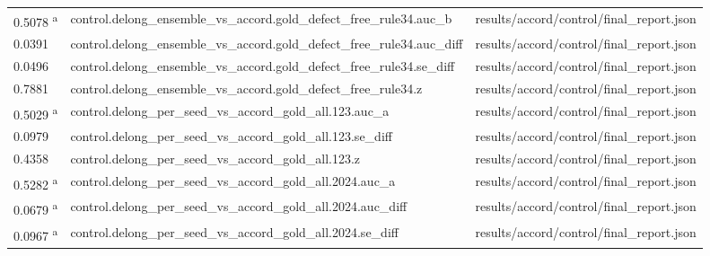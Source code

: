 \begin{longtable}{@{}p{0.7in}p{1.9in}p{2.6in}@{}}
0.5078 \textsuperscript{a} & control.\allowbreak{}delong\_ensemble\_vs\_accord.\allowbreak{}gold\_defect\_free\_rule34.\allowbreak{}auc\_b & results/\allowbreak{}accord/\allowbreak{}control/\allowbreak{}final\_report.\allowbreak{}json\\
0.0391 & control.\allowbreak{}delong\_ensemble\_vs\_accord.\allowbreak{}gold\_defect\_free\_rule34.\allowbreak{}auc\_diff & results/\allowbreak{}accord/\allowbreak{}control/\allowbreak{}final\_report.\allowbreak{}json\\
0.0496 & control.\allowbreak{}delong\_ensemble\_vs\_accord.\allowbreak{}gold\_defect\_free\_rule34.\allowbreak{}se\_diff & results/\allowbreak{}accord/\allowbreak{}control/\allowbreak{}final\_report.\allowbreak{}json\\
0.7881 & control.\allowbreak{}delong\_ensemble\_vs\_accord.\allowbreak{}gold\_defect\_free\_rule34.\allowbreak{}z & results/\allowbreak{}accord/\allowbreak{}control/\allowbreak{}final\_report.\allowbreak{}json\\
0.5029 \textsuperscript{a} & control.\allowbreak{}delong\_per\_seed\_vs\_accord\_gold\_all.\allowbreak{}123.\allowbreak{}auc\_a & results/\allowbreak{}accord/\allowbreak{}control/\allowbreak{}final\_report.\allowbreak{}json\\
0.0979 & control.\allowbreak{}delong\_per\_seed\_vs\_accord\_gold\_all.\allowbreak{}123.\allowbreak{}se\_diff & results/\allowbreak{}accord/\allowbreak{}control/\allowbreak{}final\_report.\allowbreak{}json\\
0.4358 & control.\allowbreak{}delong\_per\_seed\_vs\_accord\_gold\_all.\allowbreak{}123.\allowbreak{}z & results/\allowbreak{}accord/\allowbreak{}control/\allowbreak{}final\_report.\allowbreak{}json\\
0.5282 \textsuperscript{a} & control.\allowbreak{}delong\_per\_seed\_vs\_accord\_gold\_all.\allowbreak{}2024.\allowbreak{}auc\_a & results/\allowbreak{}accord/\allowbreak{}control/\allowbreak{}final\_report.\allowbreak{}json\\
0.0679 \textsuperscript{a} & control.\allowbreak{}delong\_per\_seed\_vs\_accord\_gold\_all.\allowbreak{}2024.\allowbreak{}auc\_diff & results/\allowbreak{}accord/\allowbreak{}control/\allowbreak{}final\_report.\allowbreak{}json\\
0.0967 \textsuperscript{a} & control.\allowbreak{}delong\_per\_seed\_vs\_accord\_gold\_all.\allowbreak{}2024.\allowbreak{}se\_diff & results/\allowbreak{}accord/\allowbreak{}control/\allowbreak{}final\_report.\allowbreak{}json\\

\end{longtable}
